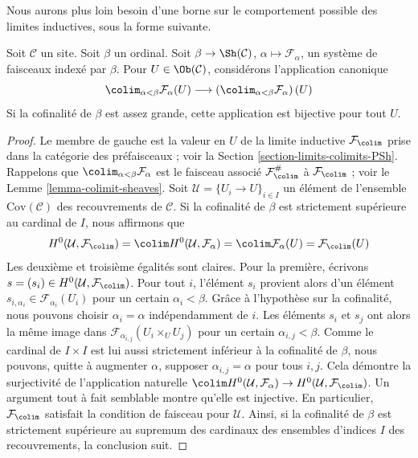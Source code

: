 \noindent
Nous aurons plus loin besoin d’une borne sur le comportement possible
des limites inductives, sous la forme suivante.

\begin{lemma}
\label{lemma-colimit-over-ordinal-sections}
Soit $\mathcal{C}$ un site. Soit $\beta$ un ordinal.
Soit $\beta \to \Sh(\mathcal{C})$, $\alpha \mapsto \mathcal{F}_\alpha$,
un système de faisceaux indexé par $\beta$. Pour $U \in \Ob(\mathcal{C})$,
considérons l’application canonique
$$
\colim_{\alpha < \beta} \mathcal{F}_\alpha(U)
\longrightarrow
\left(\colim_{\alpha < \beta} \mathcal{F}_\alpha \right)(U)
$$
Si la cofinalité de $\beta$ est assez grande, cette application
est bijective pour tout $U$.
\end{lemma}

\begin{proof}
Le membre de gauche est la valeur en $U$ de la limite inductive
$\mathcal{F}_{\colim}$ prise dans la catégorie des préfaisceaux ; voir
la Section \ref{section-limits-colimits-PSh}.
Rappelons que $\colim_{\alpha < \beta} \mathcal{F}_\alpha$ est
le faisceau associé $\mathcal{F}_{\colim}^\#$ à $\mathcal{F}_{\colim}$ ;
voir le Lemme \ref{lemma-colimit-sheaves}.
Soit $\mathcal{U} = \{U_i \to U\}_{i \in I}$ un élément de
l’ensemble $\text{Cov}(\mathcal{C})$ des recouvrements de $\mathcal{C}$.
Si la cofinalité de $\beta$ est strictement supérieure au cardinal de $I$,
nous affirmons que
$$
H^0(\mathcal{U}, \mathcal{F}_{\colim}) =
\colim H^0(\mathcal{U}, \mathcal{F}_\alpha) =
\colim \mathcal{F}_\alpha(U) = \mathcal{F}_{\colim}(U)
$$
Les deuxième et troisième égalités sont claires. Pour la première, écrivons
$s = (s_i) \in H^0(\mathcal{U}, \mathcal{F}_{\colim})$.
Pour tout $i$, l’élément $s_i$ provient alors d’un élément
$s_{i, \alpha_i} \in \mathcal{F}_{\alpha_i}(U_i)$ pour un certain
$\alpha_i < \beta$. Grâce à l’hypothèse sur la cofinalité, nous pouvons
choisir $\alpha_i = \alpha$ indépendamment de $i$. Les éléments $s_i$ et $s_j$
ont alors la même image dans
$\mathcal{F}_{\alpha_{i, j}}(U_i \times_U U_j)$
pour un certain $\alpha_{i, j} < \beta$. Comme le cardinal de
$I \times I$ est lui aussi strictement inférieur à la cofinalité de $\beta$,
nous pouvons, quitte à augmenter $\alpha$, supposer
$\alpha_{i, j} = \alpha$ pour tous $i, j$. Cela démontre la surjectivité
de l’application naturelle
$\colim H^0(\mathcal{U}, \mathcal{F}_\alpha)
\to H^0(\mathcal{U}, \mathcal{F}_{\colim})$.
Un argument tout à fait semblable montre qu’elle est injective.
En particulier, $\mathcal{F}_{\colim}$ satisfait la condition de faisceau
pour $\mathcal{U}$.
Ainsi, si la cofinalité de $\beta$ est strictement supérieure au supremum
des cardinaux des ensembles d’indices $I$ des recouvrements, la conclusion suit.
\end{proof}

